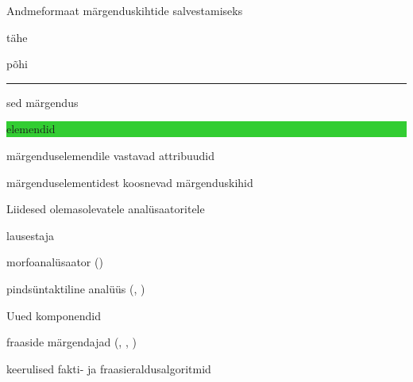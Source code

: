 \documentclass[landscape,footrule]{foils}
\begin{document}
\begin{triangles}
\item Andmeformaat märgenduskihtide salvestamiseks\vspace*{0.5ex} 
\begin{diamonds}
\item tähe{\setlength{\fboxsep}{2pt}
\colorbox{Apricot}{põhi}\textcolor{Apricot}{\rule[3pt]{2em}{3pt}}\hspace*{-2em}sed \colorbox{Apricot}{märge}ndus\colorbox{LimeGreen}{elemendid\rule[-3pt]{0pt}{12pt}}} 
\item märgenduselemendile vastavad attribuudid
\item märgenduselementidest koosnevad märgenduskihid\vspace*{2ex}
\end{diamonds}
\item Liidesed olemasolevatele analüsaatoritele\vspace*{0.5ex} 
\begin{diamonds}
\item lausestaja
\item morfoanalüsaator ()
\item pindsüntaktiline analüüs (, )
\vspace*{2ex}
\end{diamonds}
\item Uued komponendid\vspace*{0.5ex} 
\begin{diamonds}
\item fraaside märgendajad (, , \blue{$\ldots$})
\item keerulised fakti- ja fraasieraldusalgoritmid 
\vspace*{2ex}
\end{diamonds}
\end{triangles}

\end{document}
